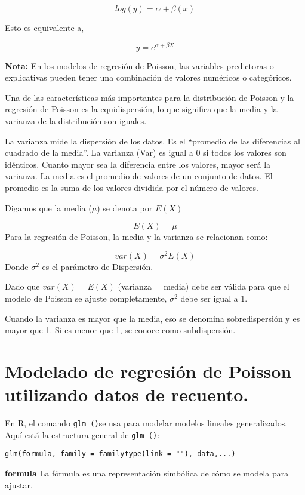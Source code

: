 \documentclass[
]{book}
\begin{document}
\[log(y)=\alpha+\beta(x) \]

Esto es equivalente a,

\[y=e^{\alpha+\beta X} \]

\textbf{Nota:} En los modelos de regresión de Poisson, las variables predictoras o explicativas pueden tener una combinación de valores numéricos o categóricos.

Una de las características más importantes para la distribución de Poisson y la regresión de Poisson es la equidispersión, lo que significa que la media y la varianza de la distribución son iguales.

La varianza mide la dispersión de los datos. Es el ``promedio de las diferencias al cuadrado de la media''. La varianza (Var) es igual a 0 si todos los valores son idénticos. Cuanto mayor sea la diferencia entre los valores, mayor será la varianza. La media es el promedio de valores de un conjunto de datos. El promedio es la suma de los valores dividida por el número de valores.

Digamos que la media (\(\mu\)) se denota por \(E(X)\)

\[E(X)=\mu\] Para la regresión de Poisson, la media y la varianza se relacionan como:

\[var(X)=\sigma^2E(X) \] Donde \(\sigma^2\) es el parámetro de Dispersión.

Dado que \(var(X)=E(X)\) (varianza = media) debe ser válida para que el modelo de Poisson se ajuste completamente, \(\sigma^2\) debe ser igual a 1.

Cuando la varianza es mayor que la media, eso se denomina sobredispersión y es mayor que 1. Si es menor que 1, se conoce como subdispersión.

\hypertarget{modelado-de-regresiuxf3n-de-poisson-utilizando-datos-de-recuento.}{%
\section{Modelado de regresión de Poisson utilizando datos de recuento.}\label{modelado-de-regresiuxf3n-de-poisson-utilizando-datos-de-recuento.}}

En R, el comando \texttt{glm\ ()}se usa para modelar modelos lineales generalizados. Aquí está la estructura general de \texttt{glm\ ()}:

\begin{verbatim}
glm(formula, family = familytype(link = ""), data,...)
\end{verbatim}

\textbf{formula} La fórmula es una representación simbólica de cómo se modela para ajustar.
\end{document}
